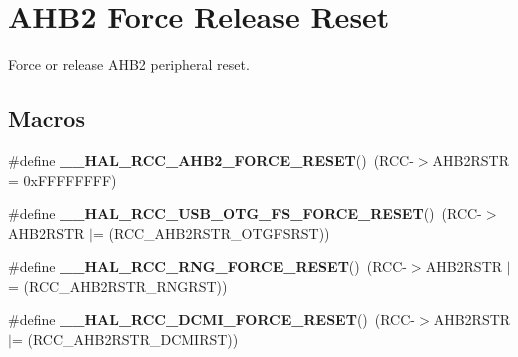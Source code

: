 \hypertarget{group___r_c_c_ex___a_h_b2___force___release___reset}{}\section{A\+H\+B2 Force Release Reset}
\label{group___r_c_c_ex___a_h_b2___force___release___reset}


Force or release A\+H\+B2 peripheral reset.  


\subsection*{Macros}
\begin{DoxyCompactItemize}
\item 
\#define {\bfseries \+\_\+\+\_\+\+H\+A\+L\+\_\+\+R\+C\+C\+\_\+\+A\+H\+B2\+\_\+\+F\+O\+R\+C\+E\+\_\+\+R\+E\+S\+ET}()~(R\+CC-\/$>$A\+H\+B2\+R\+S\+TR = 0x\+F\+F\+F\+F\+F\+F\+F\+F)\hypertarget{group___r_c_c_ex___a_h_b2___force___release___reset_gae82cd541f933be46ec8d6c3ea50d402c}{}\label{group___r_c_c_ex___a_h_b2___force___release___reset_gae82cd541f933be46ec8d6c3ea50d402c}

\item 
\#define {\bfseries \+\_\+\+\_\+\+H\+A\+L\+\_\+\+R\+C\+C\+\_\+\+U\+S\+B\+\_\+\+O\+T\+G\+\_\+\+F\+S\+\_\+\+F\+O\+R\+C\+E\+\_\+\+R\+E\+S\+ET}()~(R\+CC-\/$>$A\+H\+B2\+R\+S\+TR $\vert$= (R\+C\+C\+\_\+\+A\+H\+B2\+R\+S\+T\+R\+\_\+\+O\+T\+G\+F\+S\+R\+ST))\hypertarget{group___r_c_c_ex___a_h_b2___force___release___reset_gaaa1c3a6f5933e1a0c7335a20b34b6f4d}{}\label{group___r_c_c_ex___a_h_b2___force___release___reset_gaaa1c3a6f5933e1a0c7335a20b34b6f4d}

\item 
\#define {\bfseries \+\_\+\+\_\+\+H\+A\+L\+\_\+\+R\+C\+C\+\_\+\+R\+N\+G\+\_\+\+F\+O\+R\+C\+E\+\_\+\+R\+E\+S\+ET}()~(R\+CC-\/$>$A\+H\+B2\+R\+S\+TR $\vert$= (R\+C\+C\+\_\+\+A\+H\+B2\+R\+S\+T\+R\+\_\+\+R\+N\+G\+R\+ST))\hypertarget{group___r_c_c_ex___a_h_b2___force___release___reset_gad5f1fa1feca39e3aaa09aee9a14015b9}{}\label{group___r_c_c_ex___a_h_b2___force___release___reset_gad5f1fa1feca39e3aaa09aee9a14015b9}

\item 
\#define {\bfseries \+\_\+\+\_\+\+H\+A\+L\+\_\+\+R\+C\+C\+\_\+\+D\+C\+M\+I\+\_\+\+F\+O\+R\+C\+E\+\_\+\+R\+E\+S\+ET}()~(R\+CC-\/$>$A\+H\+B2\+R\+S\+TR $\vert$= (R\+C\+C\+\_\+\+A\+H\+B2\+R\+S\+T\+R\+\_\+\+D\+C\+M\+I\+R\+ST))\hypertarget{group___r_c_c_ex___a_h_b2___force___release___reset_ga6038f9dd2652e98fabd2e57e0342852d}{}\label{group___r_c_c_ex___a_h_b2___force___release___reset_ga6038f9dd2652e98fabd2e57e0342852d}


\end{DoxyCompactItemize}

